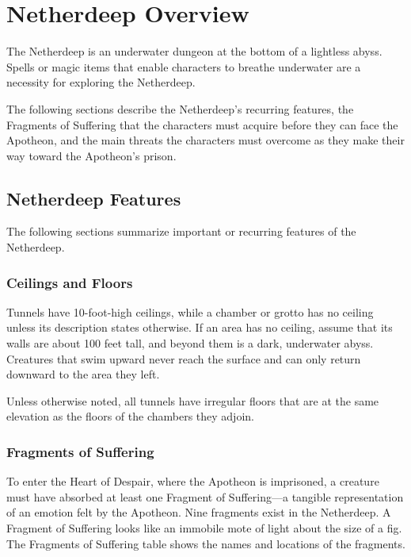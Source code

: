 \documentclass[a4paper, 11pt, bg=full, twocolumn, nooutline]{dndbook}
\begin{document}
\section{Netherdeep Overview}

The Netherdeep is an underwater dungeon at the bottom of a lightless abyss. Spells or magic items that enable characters to breathe underwater are a necessity for exploring the Netherdeep.

The following sections describe the Netherdeep's recurring features, the Fragments of Suffering that the characters must acquire before they can face the Apotheon, and the main threats the characters must overcome as they make their way toward the Apotheon's prison.



\subsection{Netherdeep Features}

The following sections summarize important or recurring features of the Netherdeep.

\subsubsection{Ceilings and Floors}

Tunnels have 10-foot-high ceilings, while a chamber or grotto has no ceiling unless its description states otherwise. If an area has no ceiling, assume that its walls are about 100 feet tall, and beyond them is a dark, underwater abyss. Creatures that swim upward never reach the surface and can only return downward to the area they left.

Unless otherwise noted, all tunnels have irregular floors that are at the same elevation as the floors of the chambers they adjoin.

\subsubsection{Fragments of Suffering}

To enter the Heart of Despair, where the Apotheon is imprisoned, a creature must have absorbed at least one Fragment of Suffering---a tangible representation of an emotion felt by the Apotheon. Nine fragments exist in the Netherdeep. A Fragment of Suffering looks like an immobile mote of light about the size of a fig. The Fragments of Suffering table shows the names and locations of the fragments.
\end{document}
